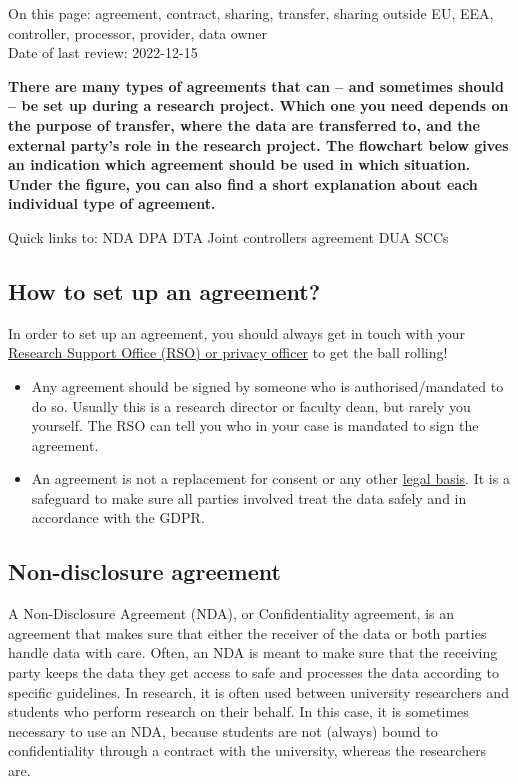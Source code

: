\documentclass[
]{book}
\providecommand{\tightlist}{%
  \setlength{\itemsep}{0pt}\setlength{\parskip}{0pt}}
\begin{document}
On this page: agreement, contract, sharing, transfer, sharing outside EU, EEA,
controller, processor, provider, data owner\\
Date of last review: 2022-12-15

\textbf{There are many types of agreements that can -- and sometimes should -- be set up
during a research project. Which one you need depends on the purpose of transfer,
where the data are transferred to, and the external party's role in the research
project. The flowchart below gives an indication which agreement should be used
in which situation. Under the figure, you can also find a short explanation
about each individual type of agreement.}

Quick links to:
NDA
DPA
DTA
Joint controllers agreement
DUA
SCCs

\hypertarget{set-up-agreements}{%
\subsection{How to set up an agreement?}\label{set-up-agreements}}

In order to set up an agreement, you should always get in touch with your
\protect\hyperlink{support}{Research Support Office (RSO) or privacy officer} to get the ball rolling!

\begin{itemize}
\tightlist
\item
  Any agreement should be signed by someone who is authorised/mandated to do so.
  Usually this is a research director or faculty dean, but rarely you yourself.
  The RSO can tell you who in your case is mandated to sign the agreement.
\item
  An agreement is not a replacement for consent or any other
  \protect\hyperlink{legal-basis}{legal basis}. It is a safeguard to make sure all
  parties involved treat the data safely and in accordance with the GDPR.
\end{itemize}

\hypertarget{nda}{%
\subsection{Non-disclosure agreement}\label{nda}}

A Non-Disclosure Agreement (NDA), or Confidentiality agreement, is an agreement
that makes sure that either the receiver of the data or both parties handle
data with care. Often, an NDA is meant to make sure that the receiving party
keeps the data they get access to safe and processes the data according to
specific guidelines. In research, it is often used between university researchers
and students who perform research on their behalf. In this case, it is sometimes
necessary to use an NDA, because students are not (always) bound to
confidentiality through a contract with the university, whereas the researchers
are.
\end{document}

